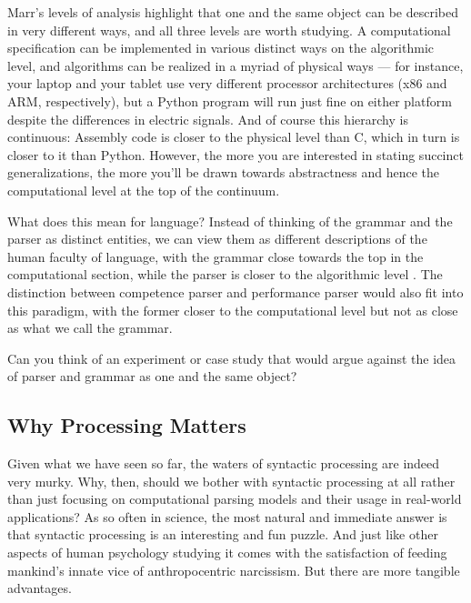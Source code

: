 %
Marr's levels of analysis highlight that one and the same object can be described in very different ways, and all three levels are worth studying.
A computational specification can be implemented in various distinct ways on the algorithmic level, and algorithms can be realized in a myriad of physical ways --- for instance, your laptop and your tablet use very different processor architectures (x86 and ARM, respectively), but a Python program will run just fine on either platform despite the differences in electric signals.
And of course this hierarchy is continuous: Assembly code is closer to the physical level than C, which in turn is closer to it than Python.
However, the more you are interested in stating succinct generalizations, the more you'll be drawn towards abstractness and hence the computational level at the top of the continuum.

What does this mean for language?
Instead of thinking of the grammar and the parser as distinct entities, we can view them as different descriptions of the human faculty of language, with the grammar close towards the top in the computational section, while the parser is closer to the algorithmic level \citep[cf.][]{NeelemanKoot10}.
The distinction between competence parser and performance parser would also fit into this paradigm, with the former closer to the computational level but not as close as what we call the grammar.

\begin{homework}
    Can you think of an experiment or case study that would argue against the idea of parser and grammar as one and the same object?
\end{homework}


\subsection{Why Processing Matters}

Given what we have seen so far, the waters of syntactic processing are indeed very murky.
Why, then, should we bother with syntactic processing at all rather than just focusing on computational parsing models and their usage in real-world applications?
As so often in science, the most natural and immediate answer is that syntactic processing is an interesting and fun puzzle.
And just like other aspects of human psychology studying it comes with the satisfaction of feeding mankind's innate vice of anthropocentric narcissism.
But there are more tangible advantages.

